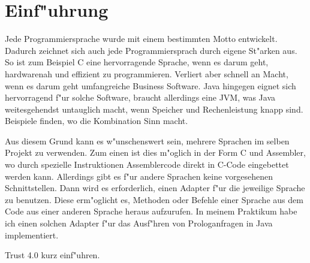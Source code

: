 
\section{Einf"uhrung}
Jede Programmiersprache wurde mit einem bestimmten Motto entwickelt. Dadurch zeichnet sich auch jede Programmiersprach durch eigene St"arken aus. So ist zum Beispiel C eine hervorragende Sprache, wenn es darum geht, hardwarenah und effizient zu programmieren. Verliert aber schnell an Macht, wenn es darum geht umfangreiche Business Software. Java hingegen eignet sich hervorragend f"ur solche Software, braucht allerdings eine JVM, was Java weitesgehendst untauglich macht, wenn Speicher und Rechenleistung knapp sind. Beispiele finden, wo die Kombination Sinn macht.

Aus diesem Grund kann es w"unschenswert sein, mehrere Sprachen im selben Projekt zu verwenden. Zum einen ist dies m"oglich in der Form C und Assembler, wo durch spezielle Instruktionen Assemblercode direkt in C-Code eingebettet werden kann. Allerdings gibt es f"ur andere Sprachen keine vorgesehenen Schnittstellen. Dann wird es erforderlich, einen Adapter f"ur die jeweilige Sprache zu benutzen. Diese erm"oglicht es, Methoden oder Befehle einer Sprache aus dem Code aus einer anderen Sprache heraus aufzurufen. In meinem Praktikum habe ich einen solchen Adapter f"ur das Ausf"hren von Prologanfragen in Java implementiert.

Trust 4.0 kurz einf"uhren.